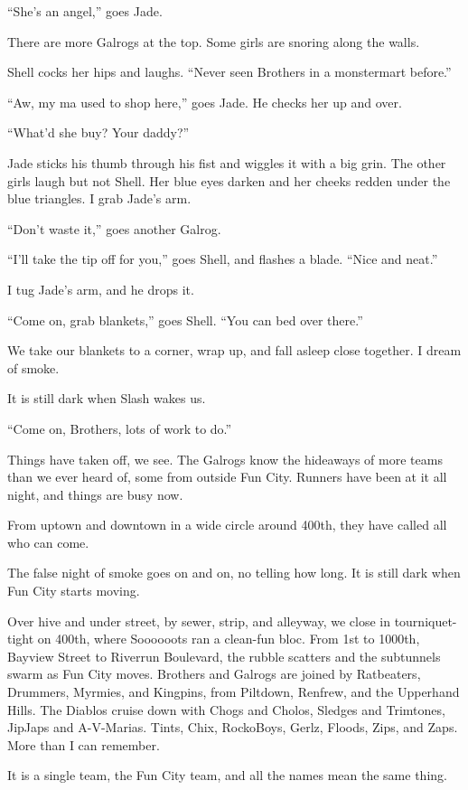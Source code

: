 “She's an angel,” goes Jade.

There are more Galrogs at the top. Some girls are snoring along the walls.

Shell cocks her hips and laughs. “Never seen Brothers in a monstermart before.”

“Aw, my ma used to shop here,” goes Jade. He checks her up and over.

“What'd she buy? Your daddy?”

Jade sticks his thumb through his fist and wiggles it with a big grin. The other girls laugh but not Shell. Her blue eyes darken and her cheeks redden under the blue triangles. I grab Jade's arm.

“Don't waste it,” goes another Galrog.

“I'll take the tip off for you,” goes Shell, and flashes a blade. “Nice and neat.”

I tug Jade's arm, and he drops it.

“Come on, grab blankets,” goes Shell. “You can bed over there.”

We take our blankets to a corner, wrap up, and fall asleep close together. I dream of smoke.

It is still dark when Slash wakes us.

“Come on, Brothers, lots of work to do.”

Things have taken off, we see. The Galrogs know the hideaways of more teams than we ever heard of, some from outside Fun City. Runners have been at it all night, and things are busy now.

From uptown and downtown in a wide circle around 400th, they have called all who can come.

The false night of smoke goes on and on, no telling how long. It is still dark when Fun City starts moving.

Over hive and under street, by sewer, strip, and alleyway, we close in tourniquet-tight on 400th, where Soooooots ran a clean-fun bloc. From 1st to 1000th, Bayview Street to Riverrun Boulevard, the rubble scatters and the subtunnels swarm as Fun City moves. Brothers and Galrogs are joined by Ratbeaters, Drummers, Myrmies, and Kingpins, from Piltdown, Renfrew, and the Upperhand Hills. The Diablos cruise down with Chogs and Cholos, Sledges and Trimtones, JipJaps and A-V-Marias. Tints, Chix, RockoBoys, Gerlz, Floods, Zips, and Zaps. More than I can remember.

It is a single team, the Fun City team, and all the names mean the same thing.

